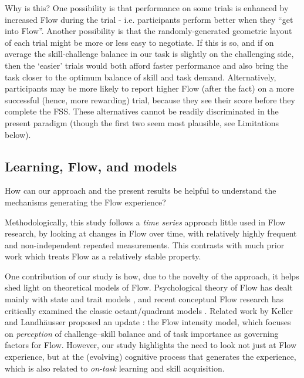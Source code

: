 \documentclass[fleqn,10pt]{wlscirep}
\begin{document}
Why is this? One possibility is that performance on some trials is enhanced by increased Flow during the trial - i.e. participants perform better when they ``get into Flow''. Another possibility is that the randomly-generated geometric layout of each trial might be more or less easy to negotiate. If this is so, and if on average the skill-challenge balance in our task is slightly on the challenging side, then the `easier' trials would both afford faster performance and also bring the task closer to the optimum balance of skill and task demand. Alternatively, participants may be more likely to report higher Flow (after the fact) on a more successful (hence, more rewarding) trial, because they see their score before they complete the FSS. These alternatives cannot be readily discriminated in the present paradigm (though the first two seem most plausible, see Limitations below).


\subsection*{Learning, Flow, and models}
How can our approach and the present results be helpful to understand the mechanisms generating the Flow experience?

Methodologically, this study follows a {\it time series} approach little used in Flow research, by looking at changes in Flow over time, with relatively highly frequent and non-independent repeated measurements. This contrasts with much prior work which treats Flow as a relatively stable property.

One contribution of our study is how, due to the novelty of the approach, it helps shed light on theoretical models of Flow. Psychological theory of Flow has dealt mainly with state and trait models \cite{Csikszentmihalyi1975}, and recent conceptual Flow research \cite{Moneta2012} has critically examined the classic octant/quadrant models \cite{Massimini1988}. Related work by Keller and Landh\"{a}usser proposed an update \cite[pp-56]{Keller2012}: the Flow intensity model, which focuses on {\it perception} of challenge--skill balance and of task importance as governing factors for Flow. However, our study highlights the need to look not just at Flow experience, but at the (evolving) cognitive process that generates the experience, which is also related to {\it on-task} learning and skill acquisition.
\end{document}
